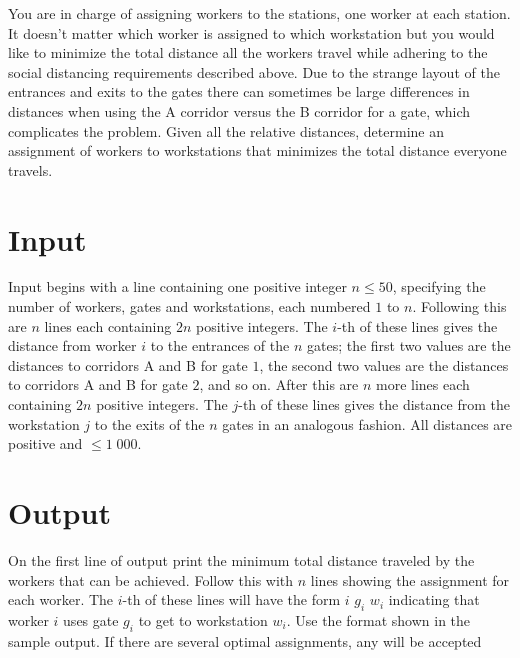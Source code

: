You are in charge of assigning workers to the stations, one worker at each station.  It doesn't matter which worker is assigned to which workstation but you would like to minimize the total distance all the workers travel while adhering to the social distancing requirements described above.  Due to the strange layout of the entrances and exits to the gates there can sometimes be large differences in distances when using the A corridor versus the B corridor for a gate, which complicates the problem.  Given all the relative distances, determine an assignment of workers to workstations that minimizes the total distance everyone travels.


\section*{Input}

Input begins with a line containing one positive integer $n \leq 50$, specifying the number of workers, gates and workstations, each numbered $1$ to $n$. Following this are $n$ lines each containing $2n$ positive integers.  The $i$-th of these lines gives the distance from worker $i$ to the entrances of the $n$ gates; the first two values are the distances to corridors A and B for gate $1$, the second two values are the distances to corridors A and B for gate $2$, and so on.  After this are $n$ more lines each containing $2n$ positive integers.  The $j$-th of these lines gives the distance from the workstation $j$ to the exits of the $n$ gates in an analogous fashion.  All distances are positive and $ \leq 1\; 000$.

\section*{Output}

On the first line of output print the minimum total distance traveled by the workers that can be achieved.  Follow this with $n$ lines showing the assignment for each worker.  The $i$-th of these lines will have the form $i$ $g_i$ $w_i$ indicating that worker $i$ uses gate $g_i$ to get to workstation $w_i$.  Use the format shown in the sample output. If there are several optimal assignments, any will be accepted

